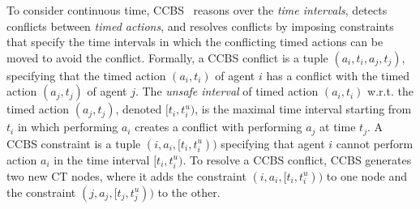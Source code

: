 \documentclass[letterpaper]{article} %
\newcommand{\ccbs}{\ac{CCBS}\xspace}
\newcommand{\ct}{\ac{CT}\xspace}
\begin{document}
To consider continuous time, \ccbs~\cite{andreychuk2019multi} reasons over the \emph{time intervals},
detects conflicts between \emph{timed actions},
and resolves conflicts by imposing constraints that specify the time intervals in which the conflicting timed actions can be moved to avoid the conflict.
Formally, a \ccbs conflict is a tuple $(a_i, t_i, a_j, t_j)$, specifying that the timed action $(a_i, t_i)$ of agent $i$ has a conflict with the timed action $(a_j, t_j)$ of agent $j$.
The \emph{unsafe interval} of timed action $(a_i, t_i)$ w.r.t. the timed action $(a_j, t_j)$, denoted $[t_i, t_i^u)$, is the maximal time interval starting from $t_i$ in which performing $a_i$ creates a conflict with performing $a_j$ at time $t_j$.
A \ccbs constraint is a tuple $(i, a_i, [t_i, t_i^u))$ specifying that agent $i$ cannot perform action $a_i$ in the time interval $[t_i, t_i^u)$.
To resolve a \ccbs conflict, \ccbs generates two new \ct nodes,
where it adds the constraint $(i, a_i, [t_i, t_i^u))$ to one node
and the constraint $(j, a_j, [t_j, t_j^u))$ to the other.





\end{document}
